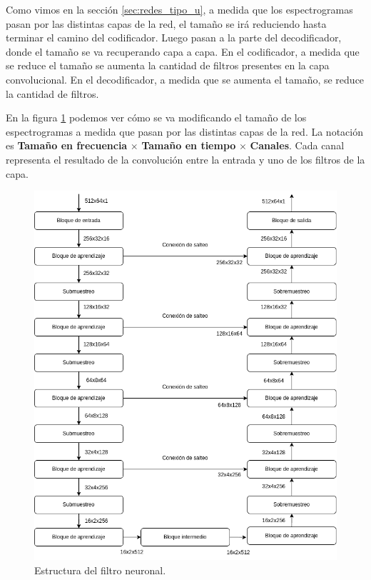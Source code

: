 Como vimos en la sección \ref{sec:redes_tipo_u}, a medida que los espectrogramas pasan por las distintas capas de la red, el tamaño se irá reduciendo hasta terminar el camino del codificador. Luego pasan a la parte del decodificador, donde el tamaño se va recuperando capa a capa. En el codificador, a medida que se reduce el tamaño se aumenta la cantidad de filtros presentes en la capa convolucional. En el decodificador, a medida que se aumenta el tamaño, se reduce la cantidad de filtros.

En la figura \ref{fig:ch7_red_estructura} podemos ver cómo se va modificando el tamaño de los espectrogramas a medida que pasan por las distintas capas de la red. La notación es \textbf{Tamaño en frecuencia} $\times$ \textbf{Tamaño en tiempo} $\times$ \textbf{Canales}. Cada canal representa el resultado de la convolución entre la entrada y uno de los filtros de la capa.

\begin{figure}
	\centering
	\centerline{\includegraphics[scale=0.65]{images/ch7/red_estructura.png}}
	\caption{Estructura del filtro neuronal.}
	\label{fig:ch7_red_estructura}
\end{figure}

